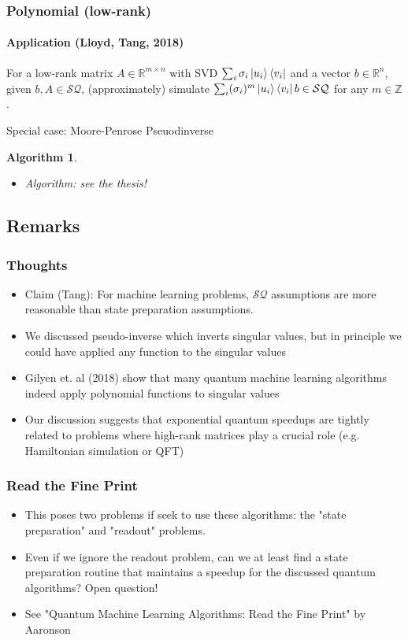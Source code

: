 \documentclass{beamer}
\newcommand\0{\mathbf{0}}
\newcommand\RR{\mathbb{R}}
\newcommand\ZZ{\mathbb{Z}}
\newcommand\<{\langle}
\renewcommand\>{\rangle}
\newtheorem{algorithm}{Algorithm}[theorem]
\begin{document}
\begin{frame}
\frametitle{Polynomial (low-rank)} 	
\framesubtitle{Application (Lloyd, Tang, 2018)}

\begin{problem} For a low-rank matrix $A \in \RR^{m\times n}$ with SVD $\sum_i \sigma_i \ket{u_i} \bra{v_i}$
  and a vector $b \in \RR^n$, given $b, A \in \mathcal{SQ}$, (approximately) simulate $\sum_i (\sigma_i)^m \ket{u_i} \bra{v_i} b \in \mathcal{SQ}$ for any $m \in \ZZ$.
\end{problem}
\begin{problem}
Special case: Moore-Penrose Pseuodinverse	
\end{problem}
\pause
\begin{algorithm}   	
\begin{itemize}
\item Algorithm: see the thesis!

\end{itemize}
\end{algorithm}
\end{frame}

\subsection{Remarks}

\begin{frame}
\frametitle{Thoughts}	

\begin{itemize}
\item Claim (Tang): For machine learning problems, $\mathcal{SQ}$ assumptions are more reasonable than state preparation assumptions.
\item We discussed pseudo-inverse which inverts singular values, but in principle we could have applied any function to the singular values
\item Gilyen et. al (2018) show that many quantum machine learning algorithms indeed apply polynomial functions to singular values
\item Our discussion suggests that exponential quantum speedups are tightly related to problems where high-rank matrices play a crucial role (e.g. Hamiltonian simulation or QFT)
\end{itemize}
\end{frame}





\begin{frame}
\frametitle{Read the Fine Print}	
\begin{itemize}
\item This poses two problems if seek to use these algorithms: the "state preparation" and "readout" problems.
\item Even if we ignore the readout problem, can we at least find a state preparation routine that maintains a speedup for the discussed quantum algorithms? Open question!
\item See "Quantum Machine Learning Algorithms: Read the Fine Print" by Aaronson
\end{itemize}
\end{frame}
\end{document}
